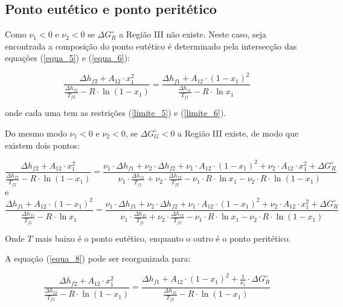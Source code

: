\subsection{Ponto eutético e ponto peritético}

Como $\nu_{1}<0$ e $\nu_{2}<0$ se $\Delta G_{R}^{\circ}$ a Região III não existe. Neste caso, seja encontrada a composição do ponto eutético é determinado pela intersecção das equações (\ref{equa_5}) e (\ref{equa_6}):

\begin{equation}
\frac{\Delta h_{f2}+A_{12}\cdot x_{1}^{2}}{\frac{\Delta h_{f2}}{T_{f2}} -R\cdot\ln(1-x_{1})}=\frac{\Delta h_{f1}+A_{12}\cdot (1-x_{1})^{2}}{\frac{\Delta h_{f1}}{T_{f1}} -R\cdot\ln x_{1}}
\end{equation}

onde cada uma tem as restrições (\ref{limite_5}) e (\ref{limite_6}).

Do mesmo modo $\nu_{1}<0$ e $\nu_{2}<0$, se $\Delta G_{G}^{\circ}<0$ a Região III existe, de modo que existem dois pontos:

\begin{equation}
\frac{\Delta h_{f2}+A_{12}\cdot x_{1}^{2}}{\frac{\Delta h_{f2}}{T_{f2}} -R\cdot\ln(1-x_{1})}=\frac{\nu_{1}\cdot\Delta h_{f1} + \nu_{2}\cdot\Delta h_{f2}+\nu_{1}\cdot A_{12}\cdot(1-x_{1})^{2}+ \nu_{2}\cdot A_{12}\cdot x_{1}^{2} + \Delta G_{R}^{\circ}}{\nu_{1}\cdot\frac{\Delta h_{f1}}{T_{f1}}+\nu_{2}\cdot\frac{\Delta h_{f2}}{T_{f2}}-\nu_{1}\cdot R\cdot\ln x_{1}-\nu_{2}\cdot R\cdot\ln(1-x_{1})}
\label{equa_8}
\end{equation}
e 
\begin{equation}
\frac{\Delta h_{f1}+A_{12}\cdot (1-x_{1})^{2}}{\frac{\Delta h_{f1}}{T_{f1}} -R\cdot\ln x_{1}}=\frac{\nu_{1}\cdot\Delta h_{f1} + \nu_{2}\cdot\Delta h_{f2}+\nu_{1}\cdot A_{12}\cdot(1-x_{1})^{2}+ \nu_{2}\cdot A_{12}\cdot x_{1}^{2} + \Delta G_{R}^{\circ}}{\nu_{1}\cdot\frac{\Delta h_{f1}}{T_{f1}}+\nu_{2}\cdot\frac{\Delta h_{f2}}{T_{f2}}-\nu_{1}\cdot R\cdot\ln x_{1}-\nu_{2}\cdot R\cdot\ln(1-x_{1})}
\label{equa_10}
\end{equation}

Onde $T$ mais baixo é o ponto eutético, enquanto o outro é o ponto peritético.

A equação (\ref{equa_8}) pode ser reorganizada para:

\begin{equation}
\frac{\Delta h_{f2}+A_{12}\cdot x_{1}^{2}}{\frac{\Delta h_{f2}}{T_{f2}} -R\cdot\ln(1-x_{1})}=\frac{\Delta h_{f1}+A_{12}\cdot(1-x_{1})^{2} +\frac{1}{\nu_{1}}\cdot\Delta G_{R}^{\circ}}{\frac{\Delta h_{f2}}{T_{f2}} -R\cdot\ln (1-x_{1})}
\label{equa_9}
\end{equation}


